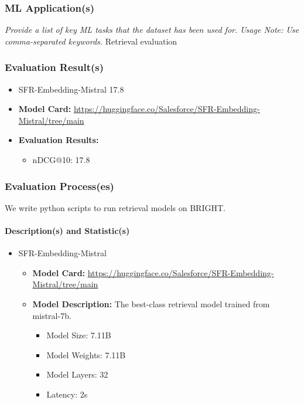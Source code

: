 \subsubsection{ML Application(s)}
\textit{Provide a list of key ML tasks that the dataset has been used for.}
\textit{Usage Note: Use comma-separated keywords.}
Retrieval evaluation

\subsubsection{Evaluation Result(s)}
\begin{itemize}
    \item SFR-Embedding-Mistral 17.8
    \item \textbf{Model Card:} \url{https://huggingface.co/Salesforce/SFR-Embedding-Mistral/tree/main}
    \item \textbf{Evaluation Results:}
    \begin{itemize}
        \item nDCG@10: 17.8
    \end{itemize}
\end{itemize}

\subsubsection{Evaluation Process(es)}
We write python scripts to run retrieval models on BRIGHT.

\paragraph{Description(s) and Statistic(s)}
\begin{itemize}
    \item SFR-Embedding-Mistral
    \begin{itemize}
        \item \textbf{Model Card:} \url{https://huggingface.co/Salesforce/SFR-Embedding-Mistral/tree/main}
        \item \textbf{Model Description:} The best-class retrieval model trained from mistral-7b.
        \begin{itemize}
            \item Model Size: 7.11B
            \item Model Weights: 7.11B
            \item Model Layers: 32
            \item Latency: 2s
        \end{itemize}
    \end{itemize}
\end{itemize}

